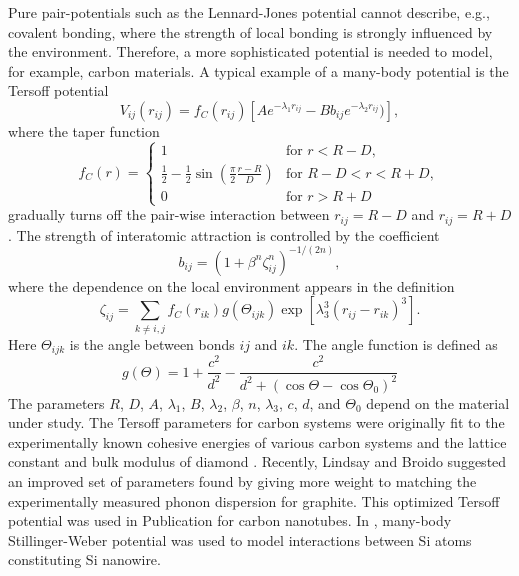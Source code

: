 Pure pair-potentials such as the Lennard-Jones potential cannot describe, e.g., covalent bonding, where the strength of local bonding is strongly influenced by the environment. Therefore, a more sophisticated potential is needed to model, for example, carbon materials. A typical example of a many-body potential is the Tersoff potential \cite{tersoff88b}
\begin{equation}
 V_{ij}(r_{ij}) = f_C(r_{ij}) \left[A e^{-\lambda_1 r_{ij}} - B b_{ij} e^{-\lambda_2 r_{ij}}) \right],
\end{equation}
where the taper function 
\begin{equation}
 f_C ( r) = \left\{ \begin{array}{ll}
                     1 & \textrm{for } r<R-D,\\
		     \frac{1}{2}-\frac{1}{2}\sin\left(\frac{\pi}{2}\frac{r-R}{D} \right) & \textrm{for } R-D < r < R+D, \\
		     0 & \textrm{for } r>R+D
                    \end{array}
 \right.
\end{equation}
gradually turns off the pair-wise interaction between $r_{ij}=R-D$ and $r_{ij}=R+D$. The strength of interatomic attraction is controlled by the coefficient
\begin{equation}
 b_{ij} = \left( 1+\beta^n \zeta_{ij}^n \right)^{-1/(2n)},
\end{equation}
where the dependence on the local environment appears in the definition 
\begin{equation}
 \zeta_{ij} = \sum_{k\neq i,j} f_C(r_{ik}) g(\Theta_{ijk}) \exp\left[\lambda_3^3(r_{ij}-r_{ik})^3 \right] .
\end{equation}
Here $\Theta_{ijk}$ is the angle between bonds $ij$ and $ik$. The angle function is defined as 
\begin{equation}
 g(\Theta) = 1 + \frac{c^2}{d^2} - \frac{c^2}{d^2 + (\cos \Theta-\cos \Theta_0)^2}
\end{equation}
The parameters $R$, $D$, $A$, $\lambda_1$, $B$, $\lambda_2$, $\beta$, $n$, $\lambda_3$, $c$, $d$, and $\Theta_0$ depend on the material under study. The Tersoff parameters for carbon systems were originally fit to the experimentally known cohesive energies of various carbon systems and the lattice constant and bulk modulus of diamond \cite{tersoff88a}. Recently, Lindsay and Broido \cite{lindsay10} suggested an improved set of parameters found by giving more weight to matching the experimentally measured phonon dispersion for graphite. This optimized Tersoff potential was used in Publication  for carbon nanotubes. In , many-body Stillinger-Weber potential \cite{stillinger85} was used to model interactions between Si atoms constituting Si nanowire. 


